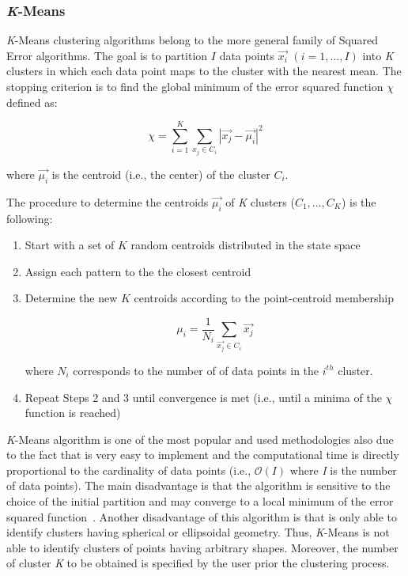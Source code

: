 \subsubsection{\emph{K}-Means}
\label{KMeans}

\emph{K}-Means clustering algorithms belong to the more general family of Squared Error algorithms. The goal is to partition $I$ data points $\vec{x_{i}}$ $(i=1,\ldots,I)$ into \emph{K} clusters in which each data point maps to the cluster with the nearest mean. The stopping criterion is to find the global minimum of the error squared function $\chi$ defined as:

\begin{equation}
    \chi = \displaystyle \sum_{i=1}^K \displaystyle \sum_{x_{j}\in C_{i}} |\vec{x_{j}}-\vec{\mu_{i}}|^{2}
\end{equation}

where $\vec{\mu_{i}}$ is the centroid (i.e., the center) of the cluster $C_{i}$.

The procedure to determine the centroids $\vec{\mu_{i}}$ of \emph{K} clusters (${C_{1},\ldots,C_{K}}$) is the following:

\begin{enumerate}
  \item Start with a set of $K$ random centroids distributed in the state space
  \item Assign each pattern to the the closest centroid
  \item Determine the new $K$ centroids according to the point-centroid membership

    \begin{equation}
        \mu_{i} = \displaystyle \frac{1}{N_{i}} \sum_{\vec{x_{j}}\in C_{i}} \vec{x_{j}}
    \end{equation}

    where $N_{i}$ corresponds to the number of of data points in the $i^{th}$ cluster.

  \item Repeat Steps 2 and 3 until convergence is met (i.e., until a minima of the $\chi$ function is reached)
\end{enumerate}

\emph{K}-Means algorithm is one of the most popular and used methodologies also due to the fact that is very easy to implement and the computational time is directly proportional to the cardinality of data points (i.e., $\mathcal{O}(I)$ where \emph{I} is the number of data points). The main disadvantage is that the algorithm is sensitive to the choice of the initial partition and may converge to a local minimum of the error squared function~\cite{JainAlgor88}. Another disadvantage of this algorithm is that is only able to identify clusters having spherical or ellipsoidal geometry. Thus, \emph{K}-Means is not able to identify clusters of points having arbitrary shapes. Moreover, the number of cluster \emph{K} to be obtained is specified by the user prior the clustering process.

